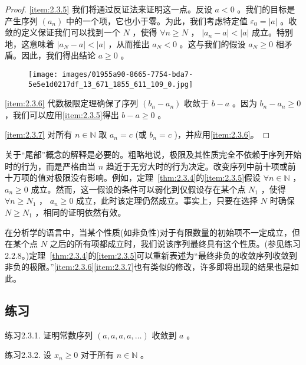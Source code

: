 \begin{proof}
  \ref{item:2.3.5} 我们将通过反证法来证明这一点。反设 \(a < 0\) 。我们的目标是产生序列 \(\left( {a}_{n}\right)\) 中的一个项，它也小于零。为此，我们考虑特定值 \({\varepsilon }_{0} = \left| a\right|\) 。收敛的定义保证我们可以找到一个 \(N\) ，使得 \(\forall n \geq  N\) ， \(\left| {{a}_{n} - a}\right|  < \left| a\right|\) 成立。特别地，这意味着 \(\left| {{a}_{N} - a}\right|  < \left| a\right|\) ，从而推出 \({a}_{N} < 0\) 。这与我们的假设 \({a}_{N} \geq  0\) 相矛盾。因此，我们得出结论 \(a \geq  0\) 。

  \begin{figure}[h]
    \centering
    \texttt{[image: images/01955a90-8665-7754-bda7-5e5e1d0217df\_13\_671\_1855\_611\_109\_0.jpg]}
  \end{figure}
  
\ref{item:2.3.6} 代数极限定理确保了序列 \(\left( {{b}_{n} - {a}_{n}}\right)\) 收敛于 \(b - a\) 。因为 \({b}_{n} - {a}_{n} \geq  0\) ，我们可以应用\ref{item:2.3.5}得出 \(b - a \geq  0\) 。

\ref{item:2.3.7} 对所有 \(n \in  \mathbb{N}\) 取 \({a}_{n} = c\) (或 \({b}_{n} = c\) )，并应用\ref{item:2.3.6}。
\end{proof}


关于“尾部”概念的解释是必要的。粗略地说，极限及其性质完全不依赖于序列开始时的行为，而是严格由当 \(n\) 趋近于无穷大时的行为决定。改变序列中前十项或前十万项的值对极限没有影响。例如，定理~\ref{thm:2.3.4}的\ref{item:2.3.5}假设 \(\forall n \in  \mathbb{N}\) ， \({a}_{n} \geq  0\) 成立。然而，这一假设的条件可以弱化到仅假设存在某个点 \({N}_{1}\) ，使得 \(\forall n \geq  {N}_{1}\) ， \({a}_{n} \geq  0\) 成立，此时该定理仍然成立。事实上，只要在选择 \(N\) 时确保 \(N\ge {N}_{1}\) ，相同的证明依然有效。

在分析学的语言中，当某个性质(如非负性)对于有限数量的初始项不一定成立，但在某个点 \(N\) 之后的所有项都成立时，我们说该序列最终具有这个性质。(参见练习2.2.8。)定理~\ref{thm:2.3.4}的\ref{item:2.3.5}可以重新表述为“最终非负的收敛序列收敛到非负的极限。”\ref{item:2.3.6}\ref{item:2.3.7}也有类似的修改，许多即将出现的结果也是如此。

\subsection{练习}

练习2.3.1. 证明常数序列 \(\left( {a,a,a,a,\ldots }\right)\) 收敛到 \(a\) 。

练习2.3.2. 设 \({x}_{n} \geq  0\) 对于所有 \(n \in  \mathbb{N}\) 。

